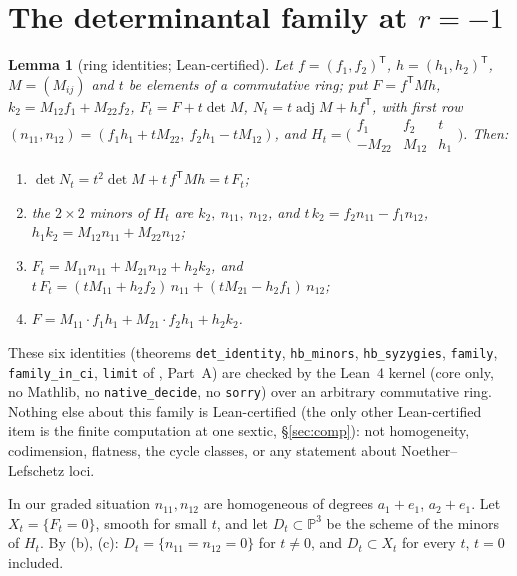 \documentclass[11pt]{article}
\numberwithin{equation}{section}
\newtheorem{lemma}[theorem]{Lemma}
\theoremstyle{remark}
\newcommand{\PP}{\mathbb{P}}
\newcommand{\adj}{\operatorname{adj}}
\begin{document}
\section{The determinantal family at \texorpdfstring{$r=-1$}{r = -1}}\label{sec:det}

\begin{lemma}[ring identities; Lean-certified]\label{lem:lean}
Let $f=(f_1,f_2)^{\mathsf T}$, $h=(h_1,h_2)^{\mathsf T}$, $M=(M_{ij})$ and $t$ be elements of a commutative ring;
put $F=f^{\mathsf T}Mh$, $k_2=M_{12}f_1+M_{22}f_2$, $F_t=F+t\det M$, $N_t=t\adj M+hf^{\mathsf T}$, with first row
$(n_{11},n_{12})=(f_1h_1+tM_{22},\ f_2h_1-tM_{12})$, and
$H_t=\bigl(\begin{smallmatrix}f_1&f_2&t\\-M_{22}&M_{12}&h_1\end{smallmatrix}\bigr)$. Then:
\begin{enumerate}[label=\textup{(\alph*)}]
\item $\det N_t=t^2\det M+t\,f^{\mathsf T}Mh=t\,F_t$;
\item the $2\times2$ minors of $H_t$ are $k_2,\ n_{11},\ n_{12}$, and $t\,k_2=f_2n_{11}-f_1n_{12}$,
$h_1k_2=M_{12}n_{11}+M_{22}n_{12}$;
\item $F_t=M_{11}n_{11}+M_{21}n_{12}+h_2k_2$, and
$t\,F_t=(tM_{11}+h_2f_2)\,n_{11}+(tM_{21}-h_2f_1)\,n_{12}$;
\item $F=M_{11}\cdot f_1h_1+M_{21}\cdot f_2h_1+h_2k_2$.
\end{enumerate}
\end{lemma}
These six identities (theorems \texttt{det\_identity}, \texttt{hb\_minors}, \texttt{hb\_syzygies},
\texttt{family}, \texttt{family\_in\_ci}, \texttt{limit} of , Part~A) are checked
by the Lean~4 kernel (core only, no Mathlib, no \texttt{native\_decide}, no \texttt{sorry}) over an arbitrary
commutative ring. Nothing else about this family is Lean-certified (the only other Lean-certified item
is the finite computation at one sextic, \S\ref{sec:comp}): not homogeneity, codimension, flatness, the
cycle classes, or any statement about Noether--Lefschetz loci.

In our graded situation $n_{11},n_{12}$ are homogeneous of degrees $a_1+e_1$, $a_2+e_1$. Let
$X_t=\{F_t=0\}$, smooth for small $t$, and let $D_t\subset\PP^3$ be the scheme of the minors of $H_t$. By (b),
(c): $D_t=\{n_{11}=n_{12}=0\}$ for $t\neq0$, and $D_t\subset X_t$ for every $t$, $t=0$ included.
\end{document}
